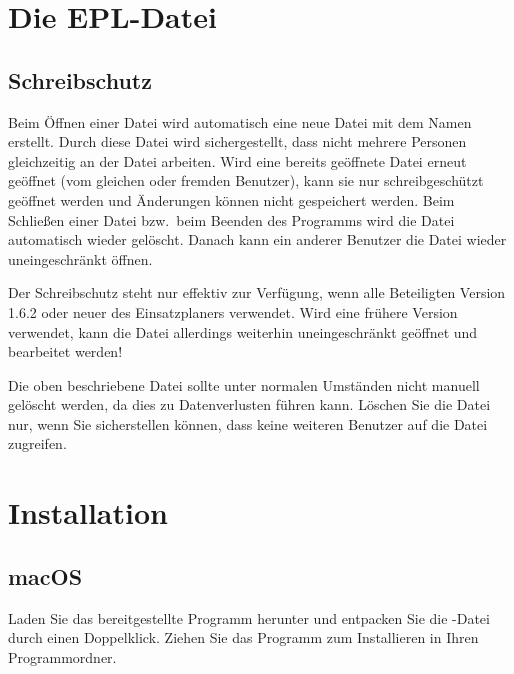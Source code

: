 \section{Die EPL-Datei}

\subsection{Schreibschutz}\label{schreibschutz}
Beim Öffnen einer Datei  wird automatisch eine neue Datei mit dem Namen  erstellt.
Durch diese Datei wird sichergestellt, dass nicht mehrere Personen gleichzeitig an der Datei  arbeiten.
Wird eine bereits geöffnete Datei erneut geöffnet (vom gleichen oder fremden Benutzer),
kann sie nur schreibgeschützt geöffnet werden und Änderungen können nicht gespeichert werden.
Beim Schließen einer Datei bzw.\ beim Beenden des Programms wird die Datei  automatisch wieder gelöscht.
Danach kann ein anderer Benutzer die Datei wieder uneingeschränkt öffnen.

\begin{hinweis}
  Der Schreibschutz steht nur effektiv zur Verfügung, wenn alle Beteiligten Version 1.6.2 oder neuer des Einsatzplaners verwendet.
  Wird eine frühere Version verwendet, kann die Datei allerdings weiterhin uneingeschränkt geöffnet und bearbeitet werden!
\end{hinweis}


\begin{hinweis}
  Die oben beschriebene Datei sollte unter normalen Umständen  nicht manuell gelöscht werden, da dies zu Datenverlusten führen kann.
  Löschen Sie die Datei nur, wenn Sie sicherstellen können, dass keine weiteren Benutzer auf die Datei zugreifen.
\end{hinweis}


\section{Installation}\label{sonstiges:installation}
\subsection{macOS}
Laden Sie das bereitgestellte Programm herunter und entpacken Sie die -Datei durch einen Doppelklick.
Ziehen Sie das Programm zum Installieren in Ihren Programmordner.

